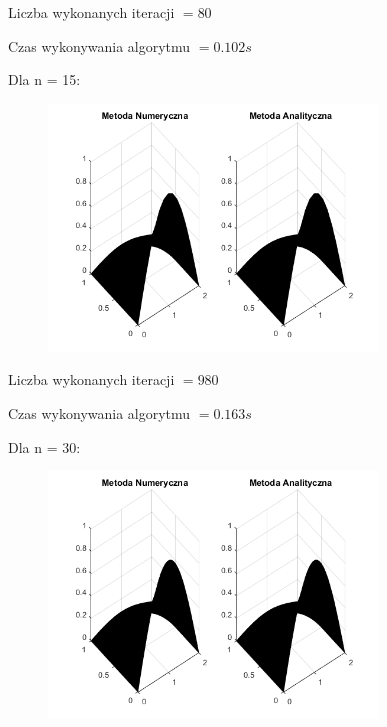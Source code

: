 Liczba wykonanych iteracji $ = 80 $

Czas wykonywania algorytmu $ = 0.102 s$

Dla n = 15:

\begin{figure}[!ht]
	\begin{center}
		\includegraphics[width=0.78\textwidth]{Lab7/charts/ftcs/15.png}
	\end{center}
\end{figure}

Liczba wykonanych iteracji $ = 980 $

Czas wykonywania algorytmu $ = 0.163 s$

\newpage

Dla n = 30:

\begin{figure}[!ht]
	\begin{center}
		\includegraphics[width=0.78\textwidth]{Lab7/charts/ftcs/30.png}
	\end{center}
\end{figure}

